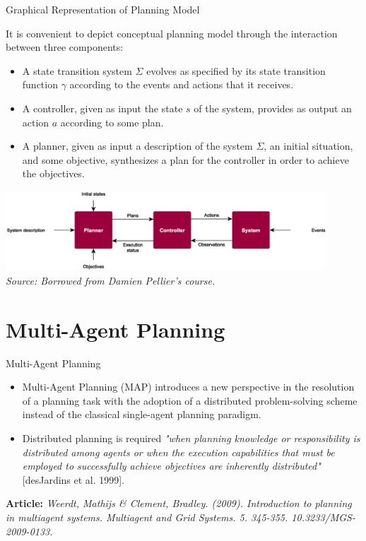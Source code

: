 \documentclass[9pt]{beamer}
\begin{document}
\begin{frame}{Graphical Representation of Planning Model}
\begin{small}

It is convenient to depict conceptual planning model through the interaction between three components:
\begin{itemize}
\item A \textcolor{CS-1light}{state transition system} $\Sigma$ evolves as specified by its state transition function $\gamma$ according to the events and actions that it receives.
\item  A \textcolor{CS-1light}{controller,} given as input the state $s$ of the system, provides as output an action $a$ according to some plan.
\item A \textcolor{CS-1light}{planner}, given as input a description of the system $\Sigma$, an initial situation, and some objective, synthesizes a plan for the controller in order to achieve the objectives.
\end{itemize}

\begin{center}
\includegraphics[keepaspectratio, width=0.90\textwidth]{images/planning_model.eps}\\
{\footnotesize \emph{Source: Borrowed from Damien Pellier's course.}}
\end{center}
\end{small}
\end{frame}

\section{Multi-Agent Planning}

\begin{frame}{Multi-Agent Planning}
\begin{small}
\begin{itemize}
\item Multi-Agent Planning (MAP) introduces a new perspective in the resolution of a planning task with the \textcolor{CS-1light}{adoption of a distributed problem-solving scheme} instead of the classical single-agent planning paradigm.
\item Distributed planning is required \emph{"when planning knowledge or responsibility is distributed among agents or when the execution capabilities that must be employed to successfully achieve objectives are inherently distributed"} [desJardins et al. 1999].
\end{itemize}

\textbf{Article:} \emph{Weerdt, Mathijs \& Clement, Bradley. (2009). Introduction to planning in multiagent systems. Multiagent and Grid Systems. 5. 345-355. 10.3233/MGS-2009-0133.}
\end{small}
\end{frame}
\end{document}
